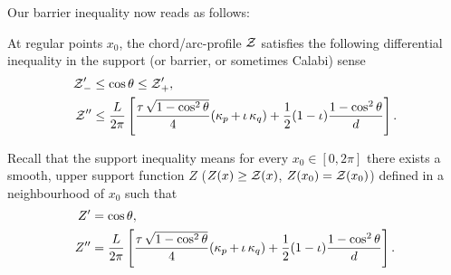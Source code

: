 \documentclass[12pt]{amsart}
\begin{document}
Our barrier inequality now reads as follows:

\begin{theorem}
\label{thm:barrier}
At regular points \(x_0\), the chord/arc-profile $\operatorname{\mathcal{Z}}$ satisfies the following differential inequality in the support (or barrier, or sometimes Calabi) sense
\begin{align*}
\operatorname{\mathcal{Z}}'_- &\leq \cos\theta \leq \operatorname{\mathcal{Z}}'_+, \\
\operatorname{\mathcal{Z}}'' &\leq \frac{L}{2\pi}\left[\frac{\operatorname{\tau} \sqrt{1-\cos^2\theta}}{4} (\operatorname{\kappa}_p + \operatorname{\iota}\operatorname{\kappa}_q) + \frac{1}{2}(1-\operatorname{\iota}) \frac{1-\cos^2\theta}{d}\right].
\end{align*}
\end{theorem}

Recall that the support inequality means for every \(x_0 \in [0,2\pi]\) there exists a smooth, upper support function \(Z\) (\(Z(x) \geq \operatorname{\mathcal{Z}} (x)\), \(Z(x_0) = \operatorname{\mathcal{Z}}(x_0)\)) defined in a neighbourhood of \(x_0\) such that
\begin{align*}
Z' &= \cos \theta, \\
Z'' &= \frac{L}{2\pi}\left[\frac{\operatorname{\tau}\sqrt{1-\cos^2\theta}}{4} (\operatorname{\kappa}_p + \operatorname{\iota}\operatorname{\kappa}_q) + \frac{1}{2} (1-\operatorname{\iota}) \frac{1-\cos^2\theta}{d}\right].
\end{align*}
\end{document}
